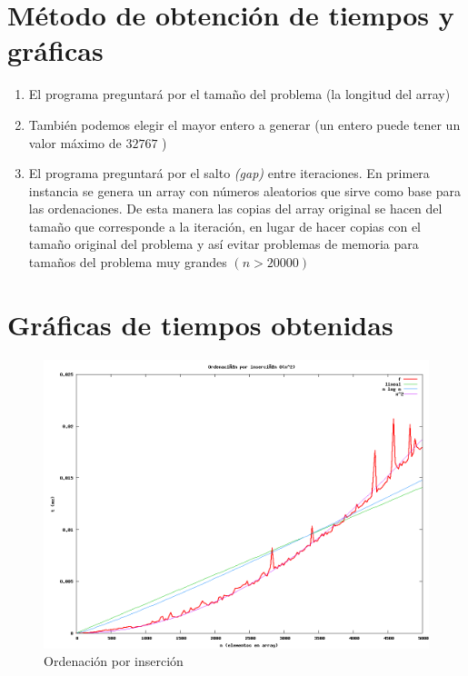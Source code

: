 \documentclass[11pt]{article}
\begin{document}
\newpage
\section{Método de obtención de tiempos y gráficas}
	\begin{enumerate}
		\item El programa preguntará por el tamaño del problema (la longitud del array)
		\item También podemos elegir el mayor entero a generar (un entero puede tener un valor 				máximo de $32767$ )
		\item El programa preguntará por el salto \emph{(gap)} entre iteraciones.  En primera instancia se genera un array con números aleatorios que sirve como base para las ordenaciones.  De esta manera las copias del array original se hacen del tamaño que corresponde a la iteración, en lugar de hacer copias con el tamaño original del problema y así evitar problemas de memoria para tamaños del problema muy grandes $(n > 20000)$
\end{enumerate}


\newpage
\section{Gráficas de tiempos obtenidas}


\begin{figure}
  \centering
    \includegraphics[width=1.0\textwidth]{insertion-sort.png}
  \caption{Ordenación por inserción}
  \label{fig:insertion}
\end{figure}
\end{document}
